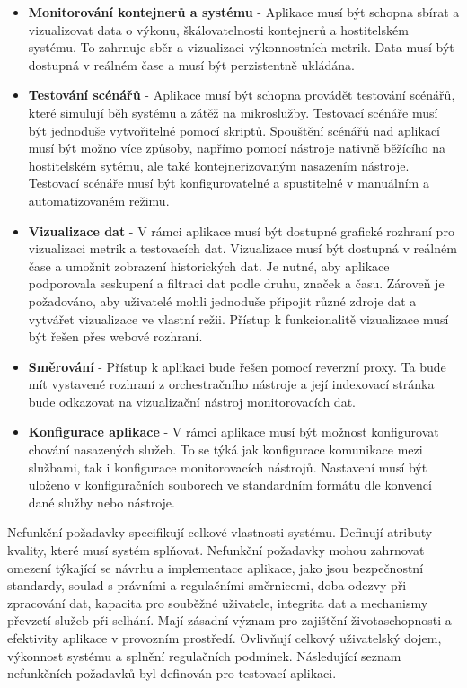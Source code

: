 \begin{itemize}
  \item \textbf{Monitorování kontejnerů a systému} - Aplikace musí být schopna sbírat a vizualizovat data o výkonu, škálovatelnosti kontejnerů a hostitelském systému. To zahrnuje sběr a vizualizaci výkonnostních metrik. Data musí být dostupná v reálném čase a musí být perzistentně ukládána.
  \item \textbf{Testování scénářů} - Aplikace musí být schopna provádět testování scénářů, které simulují běh systému a zátěž na mikroslužby. Testovací scénáře musí být jednoduše vytvořitelné pomocí skriptů. Spouštění scénářů nad aplikací musí být možno více způsoby, napřímo pomocí nástroje nativně běžícího na hostitelském sytému, ale také kontejnerizovaným nasazením nástroje. Testovací scénáře musí být konfigurovatelné a spustitelné v manuálním a automatizovaném režimu. 
  \item \textbf{Vizualizace dat} - V rámci aplikace musí být dostupné grafické rozhraní pro vizualizaci metrik a testovacích dat. Vizualizace musí být dostupná v reálném čase a umožnit zobrazení historických dat. Je nutné, aby aplikace podporovala seskupení a filtraci dat podle druhu, značek a času. Zároveň je požadováno, aby uživatelé mohli jednoduše připojit různé zdroje dat a vytvářet vizualizace ve vlastní režii. Přístup k funkcionalitě vizualizace musí být řešen přes webové rozhraní.
  \item \textbf{Směrování} - Přístup k aplikaci bude řešen pomocí reverzní proxy. Ta bude mít vystavené rozhraní z orchestračního nástroje a její indexovací stránka bude odkazovat na vizualizační nástroj monitorovacích dat.
  \item \textbf{Konfigurace aplikace} - V rámci aplikace musí být možnost konfigurovat chování nasazených služeb. To se týká jak konfigurace komunikace mezi službami, tak i konfigurace monitorovacích nástrojů. Nastavení musí být uloženo v konfiguračních souborech ve standardním formátu dle konvencí dané služby nebo nástroje.
\end{itemize}


Nefunkční požadavky specifikují celkové vlastnosti systému. Definují atributy kvality, které musí systém splňovat. Nefunkční požadavky mohou zahrnovat omezení týkající se návrhu a implementace aplikace, jako jsou bezpečnostní standardy, soulad s právními a regulačními směrnicemi, doba odezvy při zpracování dat, kapacita pro souběžné uživatele, integrita dat a mechanismy převzetí služeb při selhání. Mají zásadní význam pro zajištění životaschopnosti a efektivity aplikace v provozním prostředí. Ovlivňují celkový uživatelský dojem, výkonnost systému a splnění regulačních podmínek. Následující seznam nefunkčních požadavků byl definován pro testovací aplikaci.

